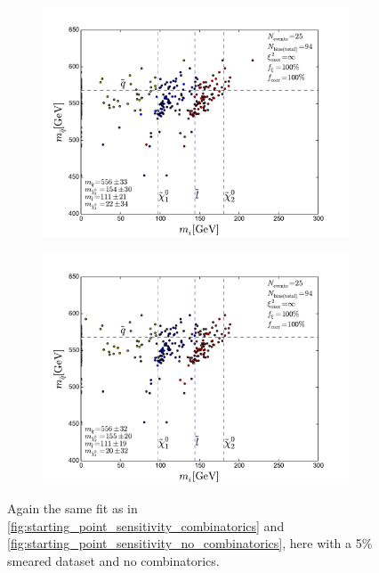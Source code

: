 \documentclass[twoside,english]{uiofysmaster}
\begin{document}
\begin{figure}[hbtp!]
	\begin{subfigure}[b]{0.45\textwidth}
		\includegraphics[width=\textwidth]{figures/improving_combinatorics/herwigpp_5psmear_lowtol_nocomb_800-500-300-50.pdf} 
		\caption{ }
	\end{subfigure}
	\begin{subfigure}[b]{0.45\textwidth}
		\includegraphics[width=\textwidth]{figures/improving_combinatorics/herwigpp_5psmear_lowtol_nocomb_1000-100-80-30.pdf}
		\caption{ } 
	\end{subfigure}
	\caption{Again the same fit as in \ref{fig:starting_point_sensitivity_combinatorics} and \ref{fig:starting_point_sensitivity_no_combinatorics}, here with a 5\% smeared dataset and no combinatorics.}
	\label{fig:moving_on-starting_point_sensitivity_no_combinatorics_5pmomsmear}
\end{figure} 
\end{document}

